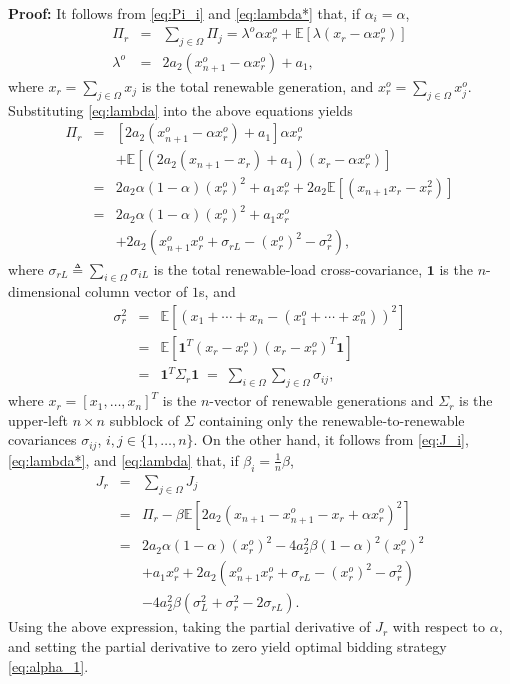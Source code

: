 \documentclass[conference]{IEEEtran}
\newcommand{\one}{\mathbf{1}}
\begin{document}
\noindent \textbf{Proof:} It follows from \eqref{eq:Pi_i} and \eqref{eq:lambda*} that, if $\alpha_i=\alpha$, 
\begin{eqnarray*}
\Pi_r & = & \sum_{j\in\Omega} \Pi_j = \lambda^o \alpha x_r^o +  \mathbb{E}[\lambda (x_r-\alpha x_r^o)] \\
 \lambda^o   & = & 2a_2\left(x_{n+1}^o-\alpha x_r^o \right) +a_1,
\end{eqnarray*}
where $x_r = \sum_{j\in\Omega} x_j$ is the total renewable generation, and $x_r^o = \sum_{j\in\Omega} x_j^o$. Substituting \eqref{eq:lambda} into the above equations yields
\begin{eqnarray}
\Pi_r & = &  [2a_2\left(x_{n+1}^o-\alpha x_r^o \right) +a_1] \alpha x_r^o \nonumber \\
&& + \mathbb{E}[(2a_2\left(x_{n+1}-x_r \right) + a_1)(x_r-\alpha x_r^o)] \nonumber \\
  & = & 2a_2\alpha(1-\alpha)(x_r^o)^2 +a_1x_r^o  + 2a_2\mathbb{E}[\left(x_{n+1}x_r-x_r^2 \right)] \nonumber\\
   & = & 2a_2\alpha(1-\alpha)(x_r^o)^2 +a_1x_r^o \nonumber \\
   && + 2a_2\left(x_{n+1}^ox_r^o+\sigma_{rL}-(x_r^o)^2-\sigma_r^2 \right), \label{eq:Pi_r_exp}
\end{eqnarray}
where $\sigma_{rL}\triangleq\sum_{i\in\Omega}\sigma_{iL}$ is the total renewable-load cross-covariance, $\one$ is the $n$-dimensional column vector of $1$s, and
\begin{eqnarray*}
    \sigma_r^2 & = & \mathbb{E}[(x_1+\cdots+x_n-(x_1^o+\cdots+x_n^o))^2] \\
    & = & \mathbb{E}[ \one^T (x_r-x_r^o)(x_r-x_r^o)^T\one] \\
    & = & \one^T \Sigma_r \one \;=\; \sum_{i\in\Omega}\sum_{j\in\Omega} \sigma_{ij},
\end{eqnarray*}
where $x_r = [x_1,\ldots,x_n]^T$ is the $n$-vector of renewable generations and $\Sigma_r$ is the upper-left $n\times n$ subblock of $\Sigma$ containing only the renewable-to-renewable covariances $\sigma_{ij}$, $i,j\in\{1,\ldots,n\}$.
On the other hand, it follows from \eqref{eq:J_i}, \eqref{eq:lambda*}, and \eqref{eq:lambda} that, if $\beta_i = \frac{1}{n}\beta$,
\begin{eqnarray*}
J_r & = & \sum_{j\in\Omega} J_j \\
 & = & \Pi_r  - \beta \mathbb{E}[2a_2 (x_{n+1}-x_{n+1}^o -x_r +\alpha x_r^o)^2] \\
 & = & 2a_2\alpha(1-\alpha)(x_r^o)^2  - 4a_2^2  \beta  (1-\alpha)^2 (x_r^o)^2 \\
 & & +a_1x_r^o + 2a_2\left(x_{n+1}^ox_r^o+\sigma_{rL}-(x_r^o)^2-\sigma_r^2 \right)\\
 && - 4a_2^2  \beta (\sigma_L^2+\sigma_r^2 - 2\sigma_{rL}). 
\end{eqnarray*}
Using the above expression, taking the partial derivative of $J_r$ with respect to $\alpha$, and setting the partial derivative to zero yield optimal bidding strategy \eqref{eq:alpha_1}. 
\end{document}
